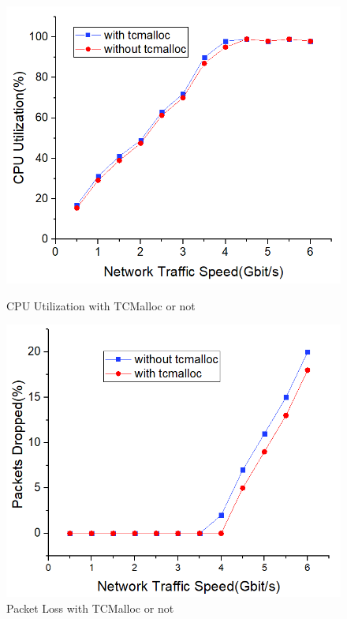 \documentclass[conference]{IEEEtran}
\begin{document}
\begin{figure}
\begin{minipage}[t]{0.495\linewidth}
\flushleft
\includegraphics[width=\textwidth]{./picture/Figure12.jpg}
\caption{CPU Utilization with TCMalloc or not} 
\label{fig:13}
\end{minipage}
\begin{minipage}[t]{0.495\linewidth}
\flushright
\includegraphics[width=\textwidth]{./picture/Figure13.jpg}
\caption{Packet Loss with TCMalloc or not}
\label{fig:14}
\end{minipage}
\end{figure} 
\end{document}
